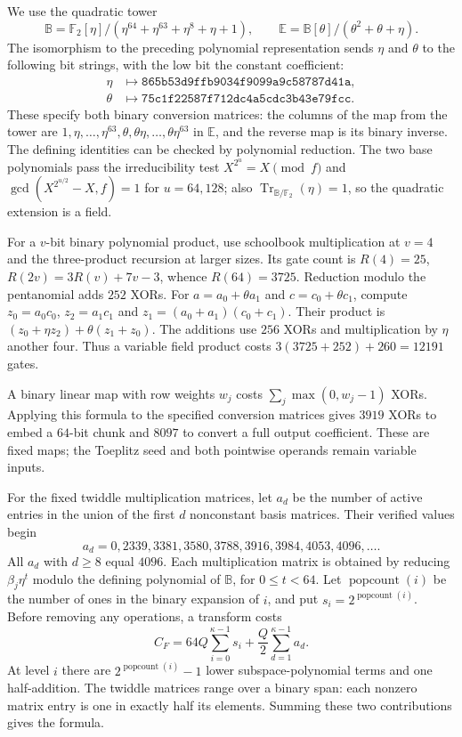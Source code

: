 \documentclass[b5paper, 10pt, abstract=true, captions=tableheading]{scrartcl}
\theoremstyle{plain}
\theoremstyle{definition}
\newcommand{\FF}{\mathds{F}}
\begin{document}
We use the quadratic tower
\[
 \mathbb B=\FF_2[\eta]/(\eta^{64}+\eta^{63}+\eta^8+\eta+1),\qquad
 \mathbb E=\mathbb B[\theta]/(\theta^2+\theta+\eta).
\]
The isomorphism to the preceding polynomial representation sends $\eta$
and $\theta$ to the following bit strings, with the low bit the constant
coefficient:
\[
\begin{aligned}
 \eta&\longmapsto\texttt{865b53d9ffb9034f9099a9c58787d41a},\\
 \theta&\longmapsto\texttt{75c1f22587f712dc4a5cdc3b43e79fcc}.
\end{aligned}
\]
These specify both binary conversion matrices: the columns of the map
from the tower are $1,\eta,\ldots,\eta^{63},\theta,\theta\eta,\ldots,
\theta\eta^{63}$ in $\mathbb E$, and the reverse map is its binary inverse.
The defining identities can be checked by polynomial reduction. The two
base polynomials pass the irreducibility test
$X^{2^u}=X\pmod f$ and $\gcd(X^{2^{u/2}}-X,f)=1$ for $u=64,128$;
also $\operatorname{Tr}_{\mathbb B/\FF_2}(\eta)=1$, so the quadratic
extension is a field.

For a $v$-bit binary polynomial product, use schoolbook multiplication
at $v=4$ and the three-product recursion at larger sizes. Its gate count is
$R(4)=25$, $R(2v)=3R(v)+7v-3$, whence $R(64)=3725$.
Reduction modulo the pentanomial adds $252$ XORs.
For $a=a_0+\theta a_1$ and $c=c_0+\theta c_1$, compute
$z_0=a_0c_0$, $z_2=a_1c_1$ and $z_1=(a_0+a_1)(c_0+c_1)$.
Their product is $(z_0+\eta z_2)+\theta(z_1+z_0)$.
The additions use $256$ XORs and multiplication by $\eta$ another four.
Thus a variable field product costs $3(3725+252)+260=12191$ gates.

A binary linear map with row weights $w_j$ costs
$\sum_j\max(0,w_j-1)$ XORs. Applying this formula to the specified
conversion matrices gives $3919$ XORs to embed a $64$-bit chunk and
$8097$ to convert a full output coefficient. These are fixed maps;
the Toeplitz seed and both pointwise operands remain variable inputs.

For the fixed twiddle multiplication matrices, let \(a_d\) be the number
of active entries in the union of the first \(d\) nonconstant basis
matrices. Their verified values begin
\[
 a_d=0,2339,3381,3580,3788,3916,3984,4053,4096,\ldots .
\]
All $a_d$ with $d\geq8$ equal $4096$. Each multiplication matrix is
obtained by reducing $\beta_j\eta^t$ modulo the defining polynomial of
$\mathbb B$, for $0\leq t<64$.
Let $\operatorname{popcount}(i)$ be the number of ones in the binary
expansion of $i$, and put $s_i=2^{\operatorname{popcount}(i)}$.
Before removing any operations, a transform costs
\begin{equation}
 C_F=64Q\sum_{i=0}^{\kappa-1}s_i
          +\frac Q2\sum_{d=1}^{\kappa-1}a_d.
 \label{eq:wopt-fulltransform}
\end{equation}
At level $i$ there are $2^{\operatorname{popcount}(i)}-1$ lower
subspace-polynomial terms and one half-addition. The twiddle matrices
range over a binary span: each nonzero matrix entry is one in exactly
half its elements. Summing these two contributions gives the formula.
\end{document}
